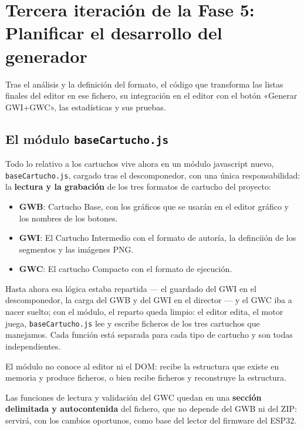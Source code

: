 \section{Tercera iteración de la Fase 5: Planificar el desarrollo del generador}
\label{sec:F5I3}

Tras el análisis y la definición del formato, el código que transforma las listas finales del
editor en ese fichero, su integración en el editor con el botón
«Generar GWI+GWC», las estadísticas y sus pruebas.

\subsection{El módulo \texttt{baseCartucho.js}}
\label{sec:F5I3Modulo}

Todo lo relativo a los cartuchos vive ahora en un módulo javascript
nuevo, \texttt{baseCartucho.js}, cargado tras el descomponedor, con
una única responsabilidad: la \textbf{lectura y la grabación} de
los tres formatos de cartucho del proyecto:

\begin{itemize}
	\item \textbf{GWB}: Cartucho Base, con los gráficos que se usarán en el editor gráfico y los nombres de los botones.
	
	\item \textbf{GWI}: El Cartucho Intermedio con el formato de autoría, la definciión de los segmentos y las imágenes PNG.
	
	\item \textbf{GWC}: El cartucho Compacto con el formato de ejecución.
\end{itemize}

Hasta ahora esa lógica
estaba repartida — el guardado del GWI en el descomponedor, la
carga del GWB y del GWI en el director — y el GWC iba a nacer
suelto; con el módulo, el reparto queda limpio: el editor edita,
el motor juega, \texttt{baseCartucho.js} lee y escribe ficheros de los tres cartuchos que manejamos. Cada función está separada para cada tipo de cartucho y son todas independientes.

El módulo no conoce al editor ni el DOM: recibe la estructura que existe en memoria y produce ficheros, o bien recibe ficheros y reconstruye la estructura.

Las funciones de lectura y validación del GWC quedan en una \textbf{sección delimitada y autocontenida} del fichero, que no depende del GWB ni del ZIP: servirá, con los cambios oportunos, como base del lector del firmware del ESP32.

